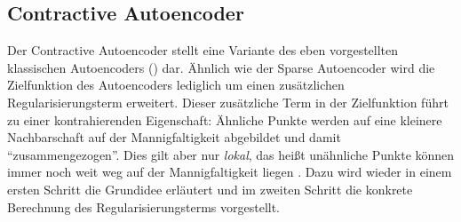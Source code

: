 \subsection{Contractive Autoencoder}
\label{ch:MethodenDerDimRed:ML:CAE}

Der Contractive Autoencoder \parencite{Rifai.2011} stellt eine Variante des eben vorgestellten klassischen Autoencoders
() dar. Ähnlich wie der Sparse Autoencoder wird die
Zielfunktion des Autoencoders lediglich um einen zusätzlichen Regularisierungsterm erweitert.
Dieser zusätzliche Term in der Zielfunktion führt zu einer kontrahierenden Eigenschaft: Ähnliche
Punkte werden auf eine kleinere Nachbarschaft auf der Mannigfaltigkeit abgebildet und damit
\enquote{zusammengezogen}. Dies gilt aber nur \textit{lokal}, das heißt unähnliche Punkte können
immer noch weit weg auf der Mannigfaltigkeit liegen \parencite[521]{Goodfellow.2016}. Dazu wird wieder in einem ersten Schritt die Grundidee erläutert und
im zweiten Schritt die konkrete Berechnung des Regularisierungsterms vorgestellt.

